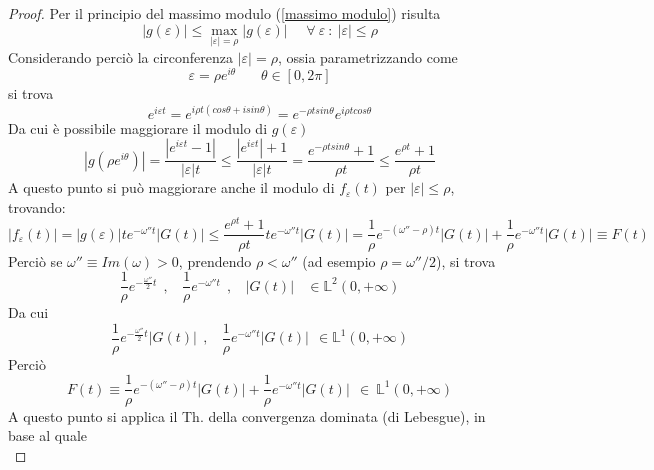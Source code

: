 \documentclass[twoside]{article}
\begin{document}
\begin{proof}
Per il principio del massimo modulo (\ref{massimo modulo}) risulta
\begin{equation}
    |g(\varepsilon)|\le \max_{|\varepsilon|=\rho}|g(\varepsilon)| \ \ \ \ \ \ \forall \ \varepsilon \ : \ |\varepsilon|\le \rho
\end{equation}
Considerando perciò la circonferenza $|\varepsilon|=\rho$, ossia parametrizzando come
\begin{equation}
    \varepsilon=\rho e^{i\theta} \ \ \ \ \ \ \ \ \theta \in [0,2\pi]
\end{equation}
si trova
\begin{equation}
    e^{i\varepsilon t}=e^{i\rho t(cos\theta + i sin \theta)}=e^{-\rho t sin \theta}e^{i\rho t cos \theta}
\end{equation}
Da cui è possibile maggiorare il modulo di $g(\varepsilon)$
\begin{equation}
    |g(\rho e^{i\theta})|=\frac{|e^{i\varepsilon t}-1|}{|\varepsilon|t}\le \frac{|e^{i\varepsilon t}|+1}{|\varepsilon|t}=\frac{e^{-\rho t sin \theta}+1}{\rho t}\le \frac{e^{\rho t}+1}{\rho t}
\end{equation}
A questo punto si può maggiorare anche il modulo di $f_\varepsilon(t)$ per $|\varepsilon|\le \rho$, trovando:
\begin{equation*}
    |f_\varepsilon(t)|=|g(\varepsilon)|t e^{-\omega''t}|G(t)|\le \frac{e^{\rho t}+1}{\rho t}t e^{-\omega'' t}|G(t)|=\frac{1}{\rho}e^{-(\omega'' -\rho)t}|G(t)|+\frac{1}{\rho}e^{-\omega'' t}|G(t)|\equiv F(t)
\end{equation*}
Perciò se $\omega''\equiv Im(\omega)>0$, prendendo $\rho < \omega''$ (ad esempio $\rho=\omega''/2$), si trova
\begin{equation}
    \frac{1}{\rho}e^{-\frac{\omega''}{2}t} \ \ , \ \ \ \ \frac{1}{\rho}e^{-\omega'' t} \ \ , \ \ \ \ |G(t)| \ \ \ \ \in \mathds{L}^2(0,+\infty)
\end{equation}
Da cui
\begin{equation}
     \frac{1}{\rho}e^{-\frac{\omega''}{2}t}|G(t)| \ \ , \ \ \ \ \frac{1}{\rho}e^{-\omega'' t}|G(t)| \ \  \in \mathds{L}^1(0,+\infty)
\end{equation}
Perciò
\begin{equation}
    F(t)\equiv \frac{1}{\rho}e^{-(\omega'' -\rho)t}|G(t)|+\frac{1}{\rho}e^{-\omega'' t}|G(t)| \ \ \in \ \mathds{L}^1(0,+\infty)
\end{equation}
A questo punto si applica il Th. della convergenza dominata (di Lebesgue), in base al quale
\begin{equation}

\end{equation}
\end{proof}
\end{document}
